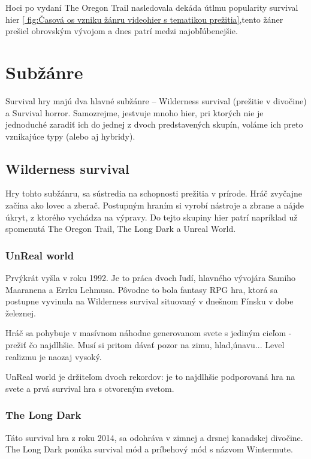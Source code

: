\documentclass[10pt,oneoside,slovak,a4paper]{article}
\begin{document}
Hoci po vydaní The Oregon Trail nasledovala dekáda útlmu popularity survival hier \ref{ fig:Časová os vzniku žánru videohier s tematikou prežitia},tento žáner prešiel obrovským vývojom a dnes patrí medzi najobľúbenejšie. \cite{IGN}


\section{Subžánre} 
Survival hry majú dva hlavné subžánre – Wilderness survival (prežitie v divočine) a Survival  horror.  Samozrejme, jestvuje mnoho hier, pri ktorých nie je jednoduché zaradiť ich do jednej z dvoch predstavených skupín, voláme ich preto vznikajúce typy (alebo aj hybridy).

\subsection{Wilderness survival}

Hry tohto subžánru, sa sústredia na schopnosti prežitia v prírode. Hráč zvyčajne začína ako lovec a zberač. Postupným hraním si vyrobí nástroje a zbrane a nájde úkryt, z ktorého vychádza na výpravy. Do tejto skupiny hier patrí napríklad už spomenutá The Oregon Trail, The Long Dark a Unreal World.

\subsubsection{UnReal world}
Prvýkrát vyšla v roku 1992. Je to práca dvoch ľudí, hlavného vývojára Samiho Maaranena a Errku Lehmusa. Pôvodne to bola fantasy RPG hra, ktorá sa postupne vyvinula na Wilderness survival situovaný v dnešnom Fínsku v dobe železnej. 

Hráč sa pohybuje v masívnom náhodne generovanom svete s jediným cieľom - prežiť čo najdlhšie. Musí si pritom dávať pozor na zimu, hlad,únavu... Level realizmu je naozaj vysoký.

UnReal world je držiteľom dvoch rekordov: je to najdlhšie podporovaná hra na svete a prvá survival hra s otvoreným svetom. \cite{UnRealWorld}

\subsubsection{The Long Dark}

Táto survival hra z roku 2014, sa odohráva v zimnej a drsnej kanadskej divočine. The Long Dark ponúka survival mód a príbehový mód s názvom Wintermute.
\end{document}
